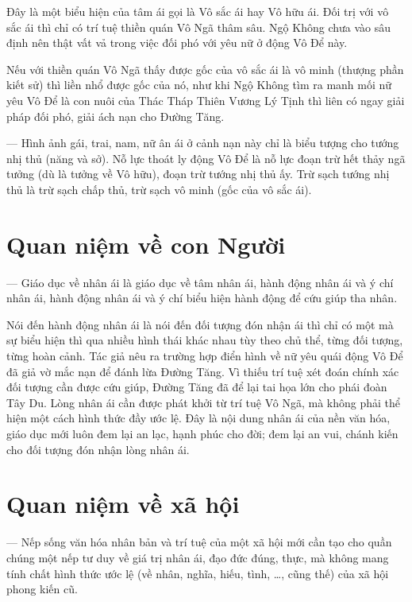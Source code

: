 Đây là một biểu hiện của tâm ái gọi là Vô sắc ái hay Vô hữu ái. Đối trị với vô sắc ái thì chỉ có trí tuệ thiền quán Vô Ngã thâm sâu. Ngộ Không chưa vào sâu định nên thật vất vả trong việc đối phó với yêu nữ ở động Vô Để này.

Nếu với thiền quán Vô Ngã thấy được gốc của vô sắc ái là vô minh (thượng phần kiết sử) thì liền nhổ được gốc của nó, như khi Ngộ Không tìm ra manh mối nữ yêu Vô Để là con nuôi của Thác Tháp Thiên Vương Lý Tịnh thì liên có ngay giải pháp đối phó, giải ách nạn cho Đường Tăng.

— Hình ảnh gái, trai, nam, nữ ân ái ở cảnh nạn này chỉ là biểu tượng cho tướng nhị thủ (năng và sở). Nỗ lực thoát ly động Vô Để là nỗ lực đoạn trừ hết thảy ngã tưởng (dù là tưởng về Vô hữu), đoạn trừ tướng nhị thủ ấy. Trừ sạch tướng nhị thủ là trừ sạch chấp thủ, trừ sạch vô minh (gốc của vô sắc ái).

\section{Quan niệm về con Người} %
\label{sec:80_81_con_nguoi}

— Giáo dục về nhân ái là giáo dục về tâm nhân ái, hành động nhân ái và ý chí nhân ái, hành động nhân ái và ý chí biểu hiện hành động để cứu giúp tha nhân.

Nói đến hành động nhân ái là nói đến đối tượng đón nhận ái thì chỉ có một mà sự biểu hiện thì qua nhiều hình thái khác nhau tùy theo chủ thể, từng đối tượng, từng hoàn cảnh. Tác giả nêu ra trường hợp điển hình về nữ yêu quái động Vô Để đã giả vờ mắc nạn để đánh lừa Đường Tăng. Vì thiếu trí tuệ xét đoán chính xác đối tượng cần được cứu giúp, Đường Tăng đã để lại tai họa lớn cho phái đoàn Tây Du. Lòng nhân ái cần được phát khởi từ trí tuệ Vô Ngã, mà không phải thể hiện một cách hình thức đầy ước lệ. Đây là nội dung nhân ái của nền văn hóa, giáo dục mới luôn đem lại an lạc, hạnh phúc cho đời; đem lại an vui, chánh kiến cho đối tượng đón nhận lòng nhân ái.

\section{Quan niệm về xã hội} %
\label{sec:80_81_xa_hoi}

— Nếp sống văn hóa nhân bản và trí tuệ của một xã hội mới cần tạo cho quần chúng một nếp tư duy về giá trị nhân ái, đạo đức đúng, thực, mà không mang tính chất hình thức ước lệ (về nhân, nghĩa, hiếu, tình, \ldots, cũng thế) của xã hội phong kiến cũ.

